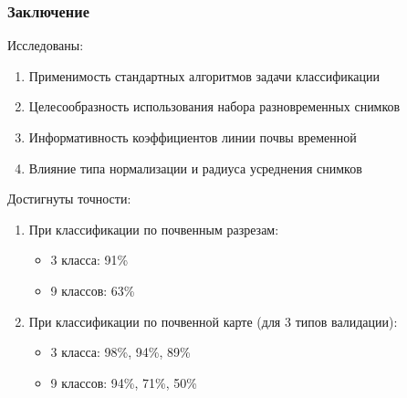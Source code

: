 \documentclass{beamer}
\begin{document}
\begin{frame}
\frametitle{Заключение}
\begin{block}{Исследованы:}
\begin{enumerate}
    \item Применимость стандартных алгоритмов задачи классификации
    \item Целесообразность использования набора разновременных снимков 
    \item Информативность коэффициентов линии почвы временной
    \item Влияние типа нормализации и радиуса усреднения снимков 
\end{enumerate}
\end{block}
\begin{block}{Достигнуты точности:}
\begin{enumerate}
    \item При классификации по почвенным разрезам:
    \begin{itemize}
        \item 3 класса: 91\%
        \item 9 классов: 63\%
    \end{itemize}
    \item При классификации по почвенной карте (для 3 типов валидации):
    \begin{itemize}
        \item 3 класса: 98\%, 94\%, 89\%
        \item 9 классов: 94\%, 71\%, 50\%
    \end{itemize}
\end{enumerate}
\end{block}
\end{frame}
\end{document}

